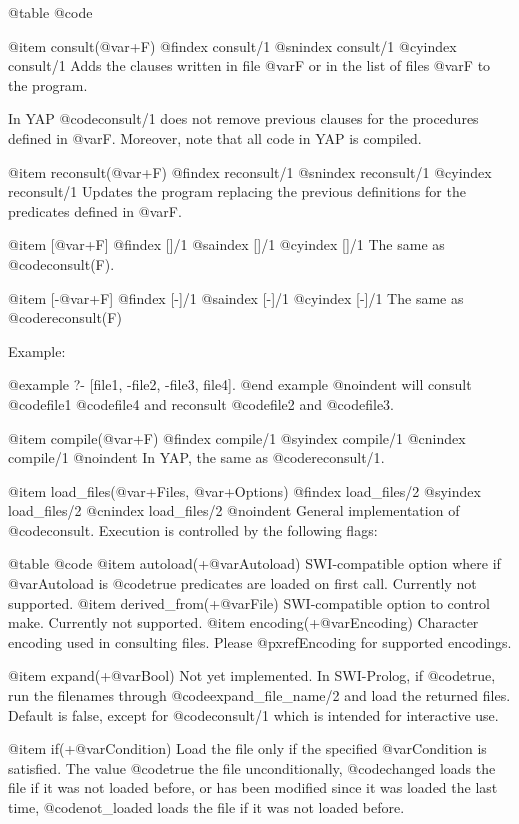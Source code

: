 {{{{@table @code

@item consult(@var{+F})
@findex consult/1
@snindex consult/1
@cyindex consult/1
Adds the clauses written in file @var{F} or in the list of files @var{F}
to the program.

In YAP @code{consult/1} does not remove previous clauses for
the procedures defined in @var{F}. Moreover, note that all code in YAP
is compiled.

@item reconsult(@var{+F})
@findex reconsult/1
@snindex reconsult/1
@cyindex reconsult/1
Updates the program replacing the
previous definitions for the predicates defined in @var{F}.


@item [@var{+F}]
@findex []/1
@saindex []/1
@cyindex []/1
The same as @code{consult(F)}.

@item [-@var{+F}]
@findex [-]/1
@saindex [-]/1
@cyindex [-]/1
The same as @code{reconsult(F)}

Example:

@example
?- [file1, -file2, -file3, file4].
@end example
@noindent
will consult @code{file1} @code{file4} and reconsult @code{file2} and
@code{file3}.

@item compile(@var{+F})
@findex compile/1
@syindex compile/1
@cnindex compile/1
@noindent
In YAP, the same as @code{reconsult/1}.

@item load_files(@var{+Files}, @var{+Options})
@findex load_files/2
@syindex load_files/2
@cnindex load_files/2
@noindent
General implementation of @code{consult}. Execution is controlled by the
following flags:

@table @code
@item autoload(+@var{Autoload})
SWI-compatible option where if @var{Autoload} is @code{true} predicates
are loaded on first call. Currently
not supported.
@item derived_from(+@var{File})
      SWI-compatible option to control make. Currently
      not supported.
@item encoding(+@var{Encoding})
Character encoding used in consulting files. Please @pxref{Encoding} for
supported encodings.

@item expand(+@var{Bool})
      Not yet implemented. In SWI-Prolog, if @code{true}, run the
    filenames through @code{expand_file_name/2} and load the returned
    files. Default is false, except for @code{consult/1} which is
    intended for interactive use.

@item if(+@var{Condition})
    Load the file only if the specified @var{Condition} is
    satisfied. The value @code{true} the file unconditionally,
    @code{changed} loads the file if it was not loaded before, or has
    been modified since it was loaded the last time, @code{not_loaded}
    loads the file if it was not loaded before.

}}}}
